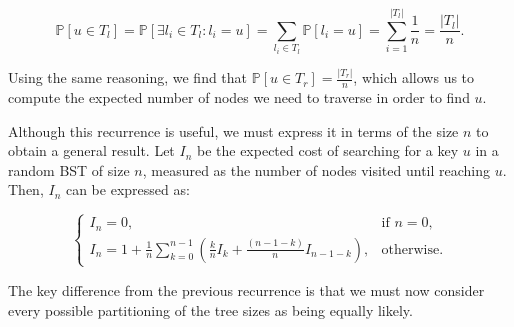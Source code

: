 \[
\mathbb{P}[u \in T_l] = \mathbb{P}[\exists l_i \in T_l : l_i = u] = \sum\limits_{l_i \in T_l}\mathbb{P}[l_i = u] = \sum\limits_{i = 1}^{|T_l|}\frac{1}{n} = \frac{|T_l|}{n}.
\]

Using the same reasoning, we find that \( \mathbb{P}[u \in T_r] = \frac{|T_r|}{n} \), which allows us to compute the expected number of nodes we need to traverse in order to find \( u \).

Although this recurrence is useful, we must express it in terms of the size \( n \) to obtain a general result. Let \( I_n \) be the expected cost of searching for a key \( u \) in a random BST of size \( n \), measured as the number of nodes visited until reaching \( u \). Then, \( I_n \) can be expressed as:

\[
\begin{cases}
I_n = 0, & \text{if } n = 0, \\
I_n = 1 + \frac{1}{n} \sum\limits_{k = 0}^{n-1} \left(\frac{k}{n} I_k + \frac{(n-1-k)}{n} I_{n-1-k}\right), & \text{otherwise}.
\end{cases}
\]

The key difference from the previous recurrence is that we must now consider every possible partitioning of the tree sizes as being equally likely.
